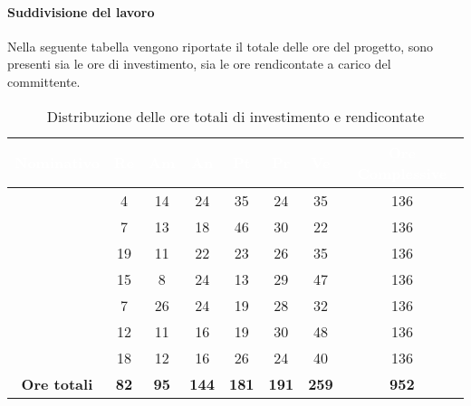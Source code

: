 \paragraph{Suddivisione del lavoro}
Nella seguente tabella vengono riportate il totale delle ore del progetto, sono presenti sia le ore di investimento, sia le ore rendicontate a carico del committente.
\begin{table}[H]
	\begin{center}
		\begin{tabular}{ |c c c c c c c c| }
		\rowcolor{darkblue} 
		\textcolor{white}{\textbf{Nominativo}} & \textcolor{white}{\textbf{Re}} & \textcolor{white}{\textbf{Am}} & \textcolor{white}{\textbf{An}} & \textcolor{white}{\textbf{Pt}} & \textcolor{white}{\textbf{Pr}} & \textcolor{white}{\textbf{Ve}} & \textcolor{white}{\textbf{Ore Complessive}} \\ \hline
		\BL 	& 4  	& 14  	& 24 	& 35 	& 24 	& 35 	& 136 \\ \hline
		\FF 	& 7 	& 13 	& 18 	& 46 	& 30 	& 22 	& 136 \\ \hline
		\MM 	& 19  	& 11  	& 22 	& 23 	& 26 	& 35  	& 136 \\ \hline
		\PC 	& 15 	& 8  	& 24 	& 13 	& 29	& 47 	& 136 \\ \hline
		\TG 	& 7  	& 26 	& 24 	& 19 	& 28 	& 32 	& 136 \\ \hline
		\TL 	& 12  	& 11 	& 16 	& 19 	& 30 	& 48 	& 136 \\ \hline
		\VD 	& 18  	& 12  	& 16 	& 26 	& 24 	& 40 	& 136 \\ \hline
		\textbf{Ore totali} & \textbf{82} & \textbf{95} & \textbf{144} & \textbf{181} & \textbf{191} & \textbf{259} & \textbf{952} \\ \hline
		\end{tabular}
	\caption{Distribuzione delle ore totali di investimento e rendicontate}
	\end{center}
\end{table}
